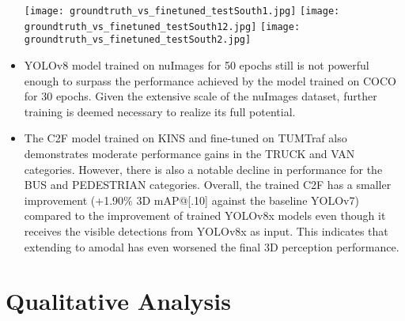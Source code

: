 \begin{itemize}
	\begin{minipage}{\linewidth}
		\centering
		\texttt{[image: groundtruth\_vs\_finetuned\_testSouth1.jpg]}
		\texttt{[image: groundtruth\_vs\_finetuned\_testSouth12.jpg]}
		\texttt{[image: groundtruth\_vs\_finetuned\_testSouth2.jpg]}
		\label{fig:groundtruth_vs_finetuned_testSouth1}
	\end{minipage}
	
	\item YOLOv8 model trained on nuImages for 50 epochs still is not powerful enough to surpass the performance achieved by the model trained on COCO for 30 epochs. Given the extensive scale of the nuImages dataset, further training is deemed necessary to realize its full potential.
	
	\item The C2F model trained on KINS and fine-tuned on TUMTraf also demonstrates moderate performance gains in the TRUCK and VAN categories. However, there is also a notable decline in performance for the BUS and PEDESTRIAN categories. Overall, the trained C2F has a smaller improvement (+1.90\% 3D mAP@[.10] against the baseline YOLOv7) compared to the improvement of trained YOLOv8x models even though it receives the visible detections from YOLOv8x as input. This indicates that extending to amodal has even worsened the final 3D perception performance. 
	
\end{itemize}


\section{Qualitative Analysis} \label{sec:qual}


